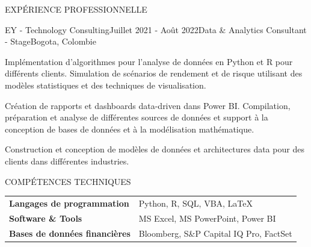 \documentclass{resume} %
\begin{document}
\begin{rSection}{EXPÉRIENCE PROFESSIONNELLE}
    \begin{rSubsection}{EY - Technology Consulting}{Juillet 2021 - Août 2022}{Data \& Analytics Consultant - Stage}{Bogota, Colombie}
        \item Implémentation d'algorithmes pour l'analyse de données en Python et R pour différents clients. Simulation de scénarios de rendement et de risque utilisant des modèles statistiques et des techniques de visualisation.
        \item Création de rapports et dashboards data-driven dans Power BI. Compilation, préparation et analyse de différentes sources de données et support à la conception de bases de données et à la modélisation mathématique.
        \item Construction et conception de modèles de données et architectures data pour des clients dans différentes industries.
    \end{rSubsection}

\end{rSection}

%
%

%
%
%

%
%

\begin{rSection}{COMPÉTENCES TECHNIQUES}

\begin{tabular}{ @{} >{\bfseries}l @{\hspace{6ex}} l }
Langages de programmation &  Python, R, SQL, VBA, \LaTeX\\
Software \& Tools & MS Excel, MS PowerPoint, Power BI \\
Bases de données financières & Bloomberg, S\&P Capital IQ Pro, FactSet \\
\end{tabular}

\end{rSection}
\end{document}
